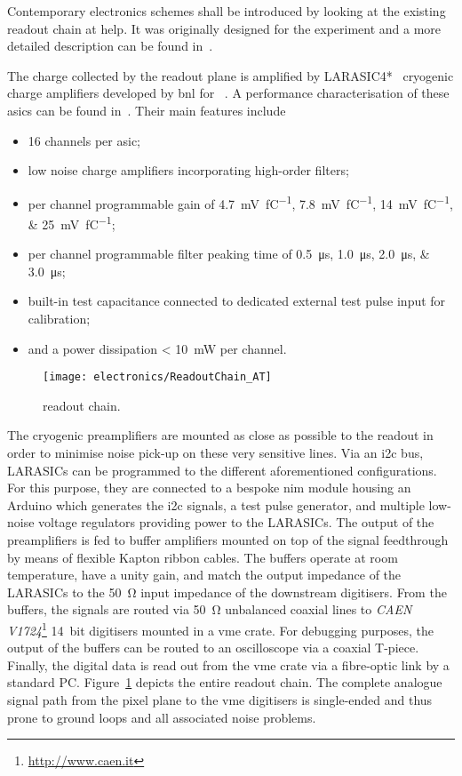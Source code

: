 Contemporary electronics schemes shall be introduced by looking at the existing readout chain at \gls{help}.
It was originally designed for the \AT{} experiment and a more detailed description can be found in~\cite{AT_larasic}.

The charge collected by the readout plane is amplified by LARASIC4*~\cite{larasic} cryogenic charge amplifiers developed by \gls{bnl} for \uboone{}~\cite{uboone}.
A performance characterisation of these \glspl{asic} can be found in~\cite{AT_larasic}.
Their main features include

\begin{itemize}
	\item \num{16} channels per \gls{asic};
	\item low noise charge amplifiers incorporating high-order filters;
	\item per channel programmable gain of \SIlist[list-final-separator = { or }]{4.7; 7.8; 14; 25}{\milli\volt\per\femto\coulomb};
	\item per channel programmable filter peaking time of \SIlist[list-final-separator = { or }]{0.5; 1.0; 2.0; 3.0}{\micro\second};
	\item built-in test capacitance connected to dedicated external test pulse input for calibration;
	\item and a power dissipation \SI{< 10}{\milli\watt} per channel.
\end{itemize}

\begin{figure}[htb]
	\centering
	\texttt{[image: electronics/ReadoutChain\_AT]}
	\caption[\AT{} readout chain]{%
		\AT{} readout chain.~\cite{AT_larasic}
	}
	\label{fig:viper_readoutChain_AT}
\end{figure}

The cryogenic preamplifiers are mounted as close as possible to the readout in order to minimise noise pick-up on these very sensitive lines.
Via an \gls{i2c} bus, LARASICs can be programmed to the different aforementioned configurations.
For this purpose, they are connected to a bespoke \gls{nim} module housing an Arduino which generates the \gls{i2c} signals, a test pulse generator, and multiple low-noise voltage regulators providing power to the LARASICs.
The output of the preamplifiers is fed to buffer amplifiers mounted on top of the signal feedthrough by means of flexible Kapton ribbon cables.
The buffers operate at room temperature, have a unity gain, and match the output impedance of the LARASICs to the \SI{50}{\ohm} input impedance of the downstream digitisers.
From the buffers, the signals are routed via \SI{50}{\ohm} unbalanced coaxial lines to \emph{CAEN V1724}\footnote{\url{http://www.caen.it}} \SI{14}{bit} digitisers mounted in a \gls{vme} crate.
For debugging purposes, the output of the buffers can be routed to an oscilloscope via a coaxial T-piece.
Finally, the digital data is read out from the \gls{vme} crate via a fibre-optic link by a standard PC.
Figure~\ref{fig:viper_readoutChain_AT} depicts the entire readout chain.
The complete analogue signal path from the pixel plane to the \gls{vme} digitisers is single-ended and thus prone to ground loops and all associated noise problems.

